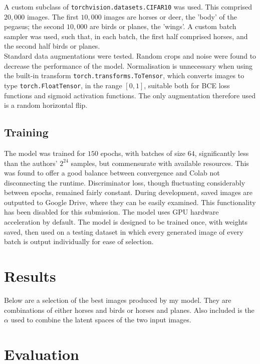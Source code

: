 \documentclass[11pt]{article} %
\begin{document}
A custom subclass of \verb|torchvision.datasets.CIFAR10| was used. This comprised $20,000$ images. The first $10,000$ images are horses or deer, the 'body' of the pegasus; the second $10,000$ are birds or planes, the 'wings'. A custom batch sampler was used, such that, in each batch, the first half comprised horses, and the second half birds or planes.\\

Standard data augmentations were tested.  Random crops and noise were found to decrease the performance of the model. Normalisation is unnecessary when using the built-in transform \verb|torch.transforms.ToTensor|, which converts images to type \verb|torch.FloatTensor|, in the range $[0, 1]$, suitable both for BCE loss functions and sigmoid activation functions. The only augmentation therefore used is a random horizontal flip. 

\subsection{Training}

The model was trained for $150$ epochs, with batches of size $64$, significantly less than the authors' $2^{24}$ samples, but commensurate with available resources. This was found to offer a good balance between convergence and Colab not disconnecting the runtime. Discriminator loss, though fluctuating considerably between epochs, remained fairly constant. During development, saved images are outputted to Google Drive, where they can be easily examined. This functionality has been disabled for this submission. The model uses GPU hardware acceleration by default. The model is designed to be trained once, with weights saved, then used on a testing dataset in which every generated image of every batch is output individually for ease of selection.

\clearpage
\section{Results}

Below are a selection of the best images produced by my model. They are combinations of either horses and birds or horses and planes. Also included is the $\alpha$ used to combine the latent spaces of the two input images.

\section{Evaluation}
\end{document}
